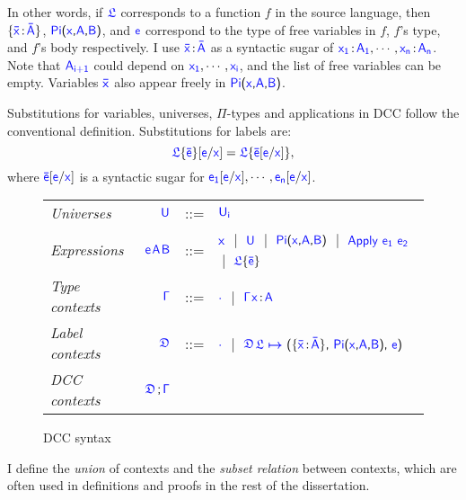 In other words, if $\target{\flabel}$ corresponds to a function $f$ in the source language, then $\{\itemtype{\bar{x}}{\bar{A}}\}$, $\targetpi{x}{A}{B}$, and $\target{e}$ correspond to the type of free variables in $f$, $f$'s type, and $f$'s body respectively.
I use $\itemtype{\bar{x}}{\bar{A}}$ as a syntactic sugar of $\itemtype{x_1}{A_1}, \cdots, \itemtype{x_n}{A_n}$. 
Note that $\target{A_{i+1}}$ could depend on $\target{x_1}, \cdots, \target{x_i}$, and the list of free variables can be empty. Variables $\target{\bar{x}}$ also appear freely in $\targetpi{x}{A}{B}$. 

Substitutions for variables, universes, $\Pi$-types and applications in DCC follow the conventional definition. Substitutions for labels are:
\begin{equation*}
\targetlab{\flabel}{\bar{e}}\targetsub{e}{x} = \target{\flabel}\{\target{\bar{e}}\targetsub{e}{x}\},
\end{equation*}
where $\target{\bar{e}}\targetsub{e}{x}$ is a syntactic sugar for $\target{e_1}\targetsub{e}{x}, \cdots, \target{e_n}\targetsub{e}{x}$.

\begin{figure}[H]
	\renewcommand{\arraystretch}{1.3}
	\begin{tabular}{l r l l}
		\textit{Universes}   & $\target{U} $       & ::= & $\target{U_i}$ \\
		\textit{Expressions} & $\target{e}$\sfcomma $\target{A}$\sfcomma $\target{B}$  & ::= & 
			$\target{x}$ $\ |\ $ $\target{U}$ $\ |\ $ $\targetpi{x}{A}{B}$ $\ |\ $ $\targetapp{e_1}{e_2}$ $\ |\ $ $\targetlab{\flabel}{\bar{e}}$\\
		\textit{Type contexts} & $\target{\Gamma}$ & ::= & $\target{\cdot}$ $\ |\ $ $\target{\Gamma}$\sfcomma $\itemtype{x}{A}$ \\
		\textit{Label contexts} & $\target{\fdef}$ & ::= & $\target{\cdot}$ $\ |\ $ 
			$\target{\fdef}$\sfcomma $\itemdef{\target{\flabel}}{\itemtype{\bar{x}}{\bar{A}}}{\targetpi{x}{A}{B}}{\target{e}}$\\
		\textit{DCC contexts} &$\targetcon$
	\end{tabular}

	\caption{DCC syntax}
    \label{fig:dcc syntax}
\end{figure}

I define the \textit{union} of contexts and the \textit{subset relation} between contexts, which are often used in definitions and proofs in the rest of the dissertation.

